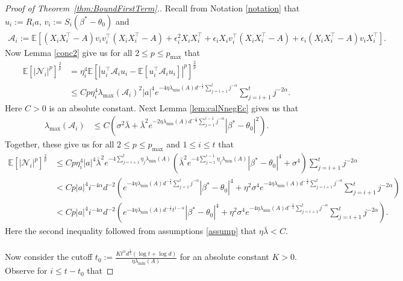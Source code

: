 \documentclass[11pt, reqno,english]{amsart}
\begin{document}
\begin{proof}[Proof of Theorem~\ref{thm:BoundFirstTerm}.] 
Recall from Notation \ref{notation} that $u_i := R_i a$, $v_i := S_i(\beta^* - \theta_0)$ and 
\begin{align*}
\mathcal A_i := \mathbb{E}[(X_iX_i^\top - A)v_i v_i^\top (X_iX_i^\top - A) + \epsilon^2_iX_iX_i^\top + \epsilon_i X_iv^\top_i(X_iX_i^\top - A) + \epsilon_i (X_iX^\top_i - A)v_i X^\top_i].
\end{align*}
Now Lemma \ref{conc2} give us for all $2 \leq p \leq p_{\max}$ that 
\begin{align*}
\mathbb{E}[|\mathcal N_i|^p]^{\frac{2}{p}} &= \eta_i^4\mathbb{E}[|u_i^\top \mathcal A_i u_i - \mathbb{E}[u_i^\top \mathcal A_i u_i]|^p]^{\frac{2}{p}}
\\
&\leq Cp\eta^4_i \lambda_{\max}(\mathcal A_i)^2 |a|^4e^{- 4\eta \lambda_{\min}(A) d^{-\frac{1}{2}}\sum_{j = i+1}^t j^{-\alpha}}\sum_{j = i+1}^t j^{-2\alpha}.
\end{align*}
Here $C > 0$ is an absolute constant. Next Lemma \ref{lem:calNnegEc} gives us that
\begin{align*}
\lambda_{\max}(\mathcal A_i) &\leq C(\sigma^2 \bar{\lambda} + \bar{\lambda}^2e^{-2\eta \lambda_{\min}(A)d^{-\frac{1}{2}}\sum_{j  = 1}^{i-1}j^{-\alpha}}|\beta^* - \theta_0|^2).
\end{align*}
Together, these give us for all $2\leq p \leq p_{\max}$ and $1 \leq i \leq t$ that
\begin{align*}
\mathbb{E}[|\mathcal N_i|^p]^{\frac{2}{p}} &\leq Cp\eta_i^4 |a|^4\bar{\lambda}^2e^{-4\sum_{j = i+1}^t \eta_j \lambda_{\min}(A)}(\bar{\lambda}^2e^{-4\sum_{j = 1}^{i-1}\eta_j \lambda_{\min}(A)}|\beta^* - \theta_0|^4 + \sigma^4)\sum_{j = i+1}^t j^{-2\alpha}
\\
&< Cp|a|^4i^{-4\alpha} d^{-2}(e^{-4\eta \lambda_{\min}(A)d^{-\frac{1}{2}}\sum_{j = 1}^tj^{-\alpha}}|\beta^* - \theta_0|^4 + \eta^2 \sigma^4 e^{-4 \eta \lambda_{\min}(A)d^{-\frac{1}{2}}\sum_{j  = i+1}^t j^{-\alpha}}\sum_{j = i+1}^t j^{-2\alpha})
\\
&< Cp|a|^4 i^{-4\alpha}d^{-2}(e^{-4\eta \lambda_{\min}(A)d^{-\frac{1}{2}}t^{1-\alpha}}|\beta^* - \theta_0|^4 + \eta^2  \sigma^4 e^{-4\eta \lambda_{\min}(A)d^{-\frac{1}{2}}\sum_{j = i+1}^t j^{-\alpha}}\sum_{j = i+1}^t j^{-2\alpha}).
\end{align*}
Here the second inequality followed from assumptions \ref{assump} that $\eta \bar{\lambda} < C$. 
\\\\
Now consider the cutoff $t_0 := \frac{Kt^{\alpha} d^{\frac{1}{2}}(\log t + \log d)}{\eta \lambda_{\min}(A)}$ for an absolute constant $K > 0$. Observe for $i \leq t - t_0$ that

\end{proof}
\end{document}
